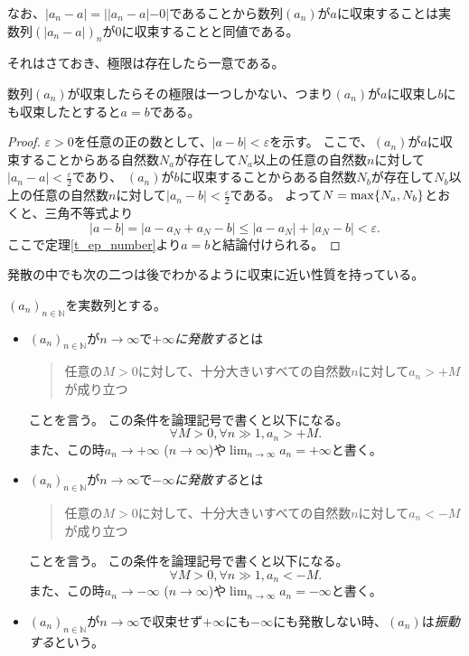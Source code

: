 なお、$|a_n-a| = ||a_n-a|-0|$であることから数列$(a_n)$が$a$に収束することは実数列$(|a_n-a|)_n$が$0$に収束することと同値である。

それはさておき、極限は存在したら一意である。

\begin{proposition}
数列$(a_n)$が収束したらその極限は一つしかない、つまり$(a_n)$が$a$に収束し$b$にも収束したとすると$a = b$である。
\end{proposition}

\begin{proof}
$\varepsilon > 0$を任意の正の数として、$|a-b| < \varepsilon$を示す。
ここで、$(a_n)$が$a$に収束することからある自然数$N_a$が存在して$N_a$以上の任意の自然数$n$に対して$|a_n-a| < \frac{\varepsilon}{2}$であり、
$(a_n)$が$b$に収束することからある自然数$N_b$が存在して$N_b$以上の任意の自然数$n$に対して$|a_n-b| < \frac{\varepsilon}{2}$である。
よって$N = \max\{ N_a, N_b \}$とおくと、三角不等式より
$$
|a-b| = |a-a_N+a_N-b| \le |a-a_N|+|a_N-b| < \varepsilon.
$$
ここで定理\ref{t_ep_number}より$a = b$と結論付けられる。
\end{proof}

発散の中でも次の二つは後でわかるように収束に近い性質を持っている。

\begin{definition}[数列の発散]
$(a_n)_{n \in \mathbb{N}}$を実数列とする。
\begin{itemize}
\item
$(a_n)_{n \in \mathbb{N}}$が$n \to \infty$で\emph{$+\infty$に発散する}とは
\begin{quote}
任意の$M > 0$に対して、十分大きいすべての自然数$n$に対して$a_n > +M$が成り立つ
\end{quote}
ことを言う。
この条件を論理記号で書くと以下になる。
$$
\forall M > 0, \forall n \gg 1, a_n > +M.
$$
また、この時$a_n \to +\infty$ ($n \to \infty$)や$\lim_{n \to \infty}a_n = +\infty$と書く。
\item
$(a_n)_{n \in \mathbb{N}}$が$n \to \infty$で\emph{$-\infty$に発散する}とは
\begin{quote}
任意の$M > 0$に対して、十分大きいすべての自然数$n$に対して$a_n < -M$が成り立つ
\end{quote}
ことを言う。
この条件を論理記号で書くと以下になる。
$$
\forall M > 0, \forall n \gg 1, a_n < -M.
$$
また、この時$a_n \to -\infty$ ($n \to \infty$)や$\lim_{n \to \infty}a_n = -\infty$と書く。
\item
$(a_n)_{n \in \mathbb{N}}$が$n \to \infty$で収束せず$+\infty$にも$-\infty$にも発散しない時、$(a_n)$は\emph{振動する}という。

\end{itemize}
\end{definition}

